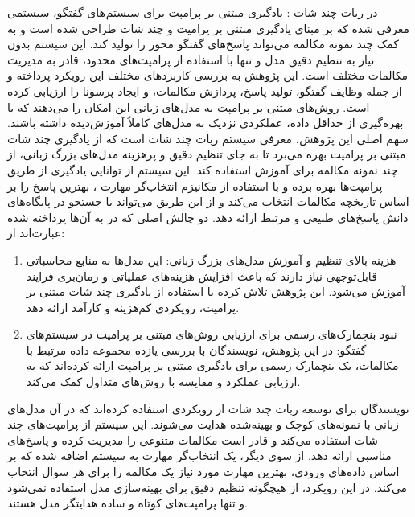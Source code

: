 در %
\cite{madotto2021few}
 ربات چند شات%
: یادگیری مبتنی بر پرامپت برای سیستم های گفتگو، سیستمی معرفی شده که بر مبنای یادگیری مبتنی بر پرامپت و چند شات طراحی شده است و به کمک چند نمونه مکالمه می‌تواند پاسخ‌های گفتگو محور را تولید کند. این سیستم بدون نیاز به تنظیم دقیق مدل و تنها با استفاده از پرامپت‌های محدود، قادر به مدیریت مکالمات مختلف است. این پژوهش به بررسی کاربردهای مختلف این رویکرد پرداخته و از جمله وظایف گفتگو، تولید پاسخ، پردازش مکالمات، و ایجاد پرسونا را ارزیابی کرده است. روش‌های مبتنی بر پرامپت به مدل‌های زبانی این امکان را می‌دهند که با بهره‌گیری از حداقل داده، عملکردی نزدیک به مدل‌های کاملاً آموزش‌دیده داشته باشند.
\newline
سهم اصلی این پژوهش، معرفی سیستم ربات چند شات است که از یادگیری چند شات مبتنی بر پرامپت بهره می‌برد تا به جای تنظیم دقیق و پرهزینه مدل‌های بزرگ زبانی، از چند نمونه مکالمه برای آموزش استفاده کند. این سیستم از توانایی یادگیری از طریق پرامپت‌ها بهره برده و با استفاده از مکانیزم 
انتخاب‌گر مهارت%
، بهترین پاسخ را بر اساس تاریخچه مکالمات انتخاب می‌کند و از این طریق می‌تواند با جستجو در پایگاه‌های دانش پاسخ‌های طبیعی و مرتبط ارائه دهد.
\newline
دو چالش اصلی که در%
\cite{madotto2021few}
 به آن‌ها پرداخته شده عبارت‌اند از: 
\begin{enumerate}
\item
 هزینه بالای تنظیم و آموزش مدل‌های بزرگ زبانی: این مدل‌ها به منابع محاسباتی قابل‌توجهی نیاز دارند که باعث افزایش 
هزینه‌های عملیاتی و زمان‌بری فرایند آموزش می‌شود. این پژوهش تلاش کرده با استفاده از یادگیری چند شات مبتنی بر پرامپت، رویکردی کم‌هزینه و کارآمد ارائه دهد.
\item
نبود بنچمارک‌های رسمی برای ارزیابی روش‌های مبتنی بر پرامپت در سیستم‌های گفتگو: در این پژوهش، نویسندگان با بررسی یازده مجموعه داده مرتبط با مکالمات، یک بنچمارک رسمی برای یادگیری مبتنی بر پرامپت ارائه کرده‌اند که به ارزیابی عملکرد و مقایسه با روش‌های متداول کمک می‌کند.
\end{enumerate}

نویسندگان برای توسعه ربات چند شات از رویکردی استفاده کرده‌اند که در آن مدل‌های زبانی با نمونه‌های کوچک و بهینه‌شده هدایت می‌شوند. این سیستم از پرامپت‌های چند شات استفاده می‌کند و قادر است مکالمات متنوعی را مدیریت کرده و پاسخ‌های مناسبی ارائه دهد. از سوی دیگر، یک انتخاب‌گر مهارت به سیستم اضافه شده که بر اساس داده‌های ورودی، بهترین مهارت  مورد نیاز یک مکالمه را برای هر سوال انتخاب می‌کند. در این رویکرد، از هیچگونه تنظیم دقیق برای بهینه‌سازی مدل استفاده نمی‌شود و تنها پرامپت‌های کوتاه و ساده هدایتگر مدل هستند.

